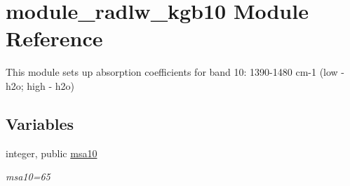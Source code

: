 \hypertarget{namespacemodule__radlw__kgb10}{}\section{module\+\_\+radlw\+\_\+kgb10 Module Reference}
\label{namespacemodule__radlw__kgb10}


This module sets up absorption coefficients for band 10\+: 1390-\/1480 cm-\/1 (low -\/ h2o; high -\/ h2o)  


\subsection*{Variables}
\begin{DoxyCompactItemize}
\item 
\mbox{\label{namespacemodule__radlw__kgb10_a2305b922082d1cc367276b636f09fb6c}} 
integer, public \hyperlink{namespacemodule__radlw__kgb10_a2305b922082d1cc367276b636f09fb6c}{msa10}
\begin{DoxyCompactList}\small\item\em msa10=65 \end{DoxyCompactList}\end{DoxyCompactItemize}
